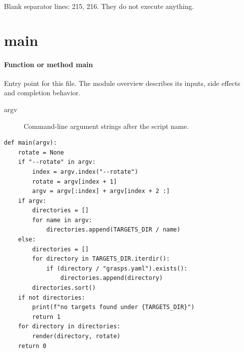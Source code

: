 \documentclass[11pt,a4paper]{book}
\begin{document}
Blank separator lines: 215, 216. They do not execute anything.

\section{main}

\paragraph{Function or method main}
Entry point for this file. The module overview describes its inputs, side effects and completion behavior.

\begin{description}
\item[argv] Command-line argument strings after the script name.
\end{description}

\begin{lstlisting}[firstnumber=217]
def main(argv):
    rotate = None
    if "--rotate" in argv:
        index = argv.index("--rotate")
        rotate = argv[index + 1]
        argv = argv[:index] + argv[index + 2 :]
    if argv:
        directories = []
        for name in argv:
            directories.append(TARGETS_DIR / name)
    else:
        directories = []
        for directory in TARGETS_DIR.iterdir():
            if (directory / "grasps.yaml").exists():
                directories.append(directory)
        directories.sort()
    if not directories:
        print(f"no targets found under {TARGETS_DIR}")
        return 1
    for directory in directories:
        render(directory, rotate)
    return 0


\end{lstlisting}
\end{document}
